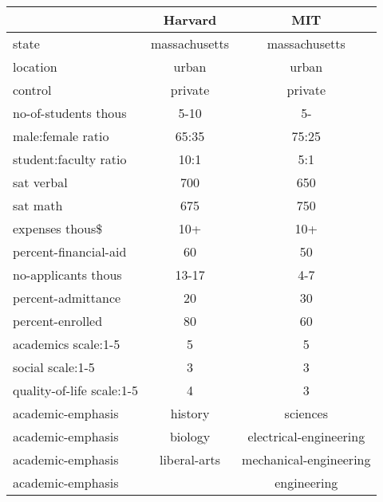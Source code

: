 \documentclass[a4paper, 11pt, hyperref, titlepage]{article}
\begin{document}
\begin{tabular}{lcc}
\hline

           &    Harvard &        MIT \\
\hline

     state & massachusetts & massachusetts \\

  location &      urban &      urban \\

   control &    private &    private \\

no-of-students thous &       5-10 &         5- \\

male:female ratio &      65:35 &      75:25 \\

student:faculty ratio &       10:1 &        5:1 \\

sat verbal &        700 &        650 \\

  sat math &        675 &        750 \\

expenses thous\$ &        10+ &        10+ \\

percent-financial-aid &         60 &         50 \\

no-applicants thous &      13-17 &        4-7 \\

percent-admittance &         20 &         30 \\

percent-enrolled &         80 &         60 \\

academics scale:1-5 &          5 &          5 \\

social scale:1-5 &          3 &          3 \\

quality-of-life scale:1-5 &          4 &          3 \\

academic-emphasis &    history &   sciences \\

academic-emphasis &    biology & electrical-engineering \\

academic-emphasis & liberal-arts & mechanical-engineering \\

academic-emphasis &            & engineering \\

\hline

\end{tabular}  
\end{document}
